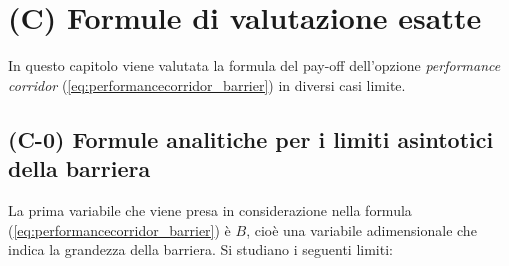 \chapter{(C) Formule di valutazione esatte} \label{cap:exactformulas}

In questo capitolo viene valutata la formula del pay-off dell'opzione \textit{performance corridor} (\ref{eq:performancecorridor_barrier}) in diversi casi limite. 

\section{(C-0) Formule analitiche per i limiti asintotici della barriera}

La prima variabile che viene presa in considerazione nella formula (\ref{eq:performancecorridor_barrier}) è $B$, cioè una variabile adimensionale che indica la grandezza della barriera. Si studiano i seguenti limiti:
